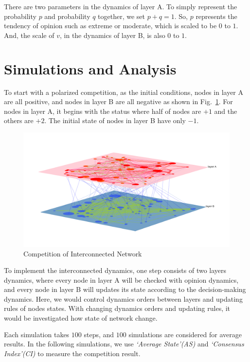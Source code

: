 \documentclass[review]{elsarticle}
\begin{document}
There are two parameters in the dynamics of layer A. To simply represent the probability $p$ and probability $q$ together, we set $p+q=1$. So, $p$ represents the tendency of opinion such as extreme or moderate, which is scaled to be $0$ to $1$. And, the scale of $v$, in the dynamics of layer B, is also $0$ to $1$. 

\section{Simulations and Analysis}
To start with a polarized competition, as the initial conditions, nodes in layer A are all positive, and nodes in layer B are all negative as shown in Fig.~\ref{competition}. For nodes in layer A, it begins with the status where half of nodes are $+1$ and the others are $+2$. The initial state of nodes in layer B have only $-1$.
 
\begin{figure}[!htb]
	\centering
	\includegraphics[width=\hsize]{competition.png}
	\caption{Competition of Interconnected Network}
	\label{competition}
\end{figure}

To implement the interconnected dynamics, one step consists of two layers dynamics, where every node in layer A will be checked with opinion dynamics, and every node in layer B will updates its state according to the decision-making dynamics. Here, we would control dynamics orders between layers and updating rules of nodes states. With changing dynamics orders and updating rules, it would be investigated how state of network change.      

Each simulation takes $100$ steps, and $100$ simulations are considered for average results. In the following simulations, we use \textit{`Average State'(AS)} and \textit{`Consensus Index'(CI)} to measure the competition result.
\end{document}
